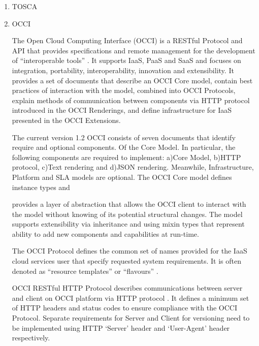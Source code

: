 \begin{enumerate}
\begin{enumerate}
\end{enumerate}

\item {} 
TOSCA

\item {} 
OCCI

The Open Cloud Computing Interface (OCCI) is a RESTful
Protocol and API that provides specifications  and remote
management for the development of “interoperable tools”
\label{\detokenize{i524/technologies:id561}}{\hyperref[\detokenize{i524/technologies:www-occi}]{\sphinxcrossref{{[}481{]}}}}. It supports IaaS, PaaS and SaaS and
focuses on integration, portability, interoperability,
innovation and extensibility. It provides a set of documents
that describe an OCCI Core model, contain best practices
of interaction with the model, combined into OCCI Protocols,
explain methods of communication between components via
HTTP protocol introduced in the OCCI Renderings, and
define infrastructure for IaaS presented in the OCCI
Extensions.

The current version 1.2 OCCI consists of seven documents that
identify require and optional components. Of the Core Model.  In
particular, the following components are required to implement:
a)Core Model, b)HTTP protocol, c)Text rendering and d)JSON
rendering. Meanwhile, Infrastructure, Platform and SLA models are
optional.  The OCCI Core model defines instance types and

provides a layer of abstraction that allows the OCCI client
to interact with the model without knowing of its potential
structural changes. The model supports extensibility via
inheritance and using mixin types that represent ability to
add new components and capabilities at run-time.
\label{\detokenize{i524/technologies:id562}}{\hyperref[\detokenize{i524/technologies:nyren-edmonds-papaspyrou-2016}]{\sphinxcrossref{{[}482{]}}}}

The OCCI Protocol defines the common set of names provided
for the IaaS cloud services user that specify requested
system requirements. It is often denoted as “resource
templates” or “flavours”   \label{\detokenize{i524/technologies:id563}}{\hyperref[\detokenize{i524/technologies:drescher-parak-wallom-2015}]{\sphinxcrossref{{[}483{]}}}}.

OCCI RESTful HTTP Protocol describes communications between
server and client on OCCI platform via HTTP protocol
\label{\detokenize{i524/technologies:id564}}{\hyperref[\detokenize{i524/technologies:nyren-edmonds-metsch-2016}]{\sphinxcrossref{{[}484{]}}}}. It defines a minimum set of HTTP
headers and status codes to ensure compliance with the
OCCI Protocol. Separate requirements for Server and Client
for versioning need to be implemented using HTTP `Server'
header and `User-Agent' header respectively.


\end{enumerate}
